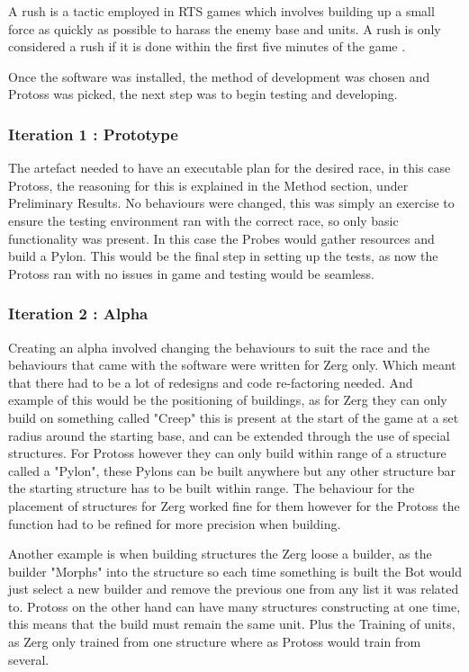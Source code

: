 \documentclass[journal]{IEEEtran}
\begin{document}
A rush is a tactic employed in RTS games which involves building up a small force as quickly as possible to harass the enemy base and units. A rush is only considered a rush if it is done within the first five minutes of the game \cite{Liqui}.

Once the software was installed, the method of development was chosen and Protoss was picked, the next step was to begin testing and developing. 
\newline

\subsubsection{Iteration 1 : Prototype}
The artefact needed to have an executable plan for the desired race, in this case Protoss, the reasoning for this is explained in the Method section, under Preliminary Results. No behaviours were changed, this was simply an exercise to ensure the testing environment ran with the correct race, so only basic functionality was present. In this case the Probes would gather resources and build a Pylon. This would be the final step in setting up the tests, as now the Protoss ran with no issues in game and testing would be seamless.
\newline

\subsubsection{Iteration 2 : Alpha}
Creating an alpha involved changing the behaviours to suit the race and the behaviours that came with the software were written for Zerg only. Which meant that there had to be a lot of redesigns and code re-factoring needed. And example of this would be the positioning of buildings, as for Zerg they can only build on something called "Creep" this is present at the start of the game at a set radius around the starting base, and can be extended through the use of special structures. For Protoss however they can only build within range of a structure called a "Pylon", these Pylons can be built anywhere but any other structure bar the starting structure has to be built within range. The behaviour for the placement of structures for Zerg worked fine for them however for the Protoss the function had to be refined for more precision when building. 

Another example is when building structures the Zerg loose a builder, as the builder "Morphs" into the structure so each time something is built the Bot would just select a new builder and remove the previous one from any list it was related to. Protoss on the other hand can have many structures constructing at one time, this means that the build must remain the same unit. Plus the Training of units, as Zerg only trained from one structure where as Protoss would train from several.
\end{document}
